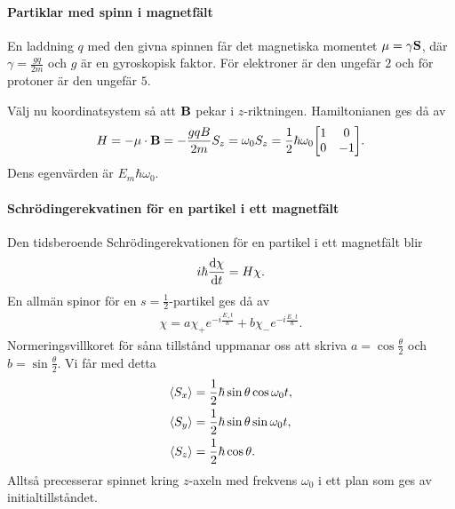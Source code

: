 \paragraph{Partiklar med spinn i magnetfält}
En laddning $q$ med den givna spinnen får det magnetiska momentet $\vb{\mu} = \gamma\vb{S}$, där $\gamma = \frac{gq}{2m}$ och $g$ är en gyroskopisk faktor. För elektroner är den ungefär $2$ och för protoner är den ungefär $5$.

Välj nu koordinatsystem så att $\vb{B}$ pekar i $z$-riktningen. Hamiltonianen ges då av
\begin{align*}
	H = -\vb{\mu}\cdot\vb{B} = -\frac{gqB}{2m}S_{z} = \omega_{0}S_{z} = \frac{1}{2}\hbar\omega_{0}
	\mqty[
		1 & 0 \\
		0 & -1
	].
\end{align*}
Dens egenvärden är $E_{m}\hbar\omega_{0}$.

\paragraph{Schrödingerekvatinen för en partikel i ett magnetfält}
Den tidsberoende Schrödingerekvationen för en partikel i ett magnetfält blir
\begin{align*}
	i\hbar\dv{\chi}{t} = H\chi.
\end{align*}
En allmän spinor för en $s = \frac{1}{2}$-partikel ges då av
\begin{align*}
	\chi = a\chi_{+}e^{-i\frac{E_{+}t}{\hbar}} + b\chi_{-}e^{-i\frac{E_{-}t}{\hbar}}.
\end{align*}
Normeringsvillkoret för såna tillstånd uppmanar oss att skriva $a = \cos{\frac{\theta}{2}}$ och $b = \sin{\frac{\theta}{2}}$. Vi får med detta
\begin{align*}
	\expval{S_{x}} &= \frac{1}{2}\hbar\sin{\theta}\cos{\omega_{0}t}, \\
	\expval{S_{y}} &= \frac{1}{2}\hbar\sin{\theta}\sin{\omega_{0}t}, \\
	\expval{S_{z}} &= \frac{1}{2}\hbar\cos{\theta}.
\end{align*}
Alltså precesserar spinnet kring $z$-axeln med frekvens $\omega_{0}$ i ett plan som ges av initialtillståndet.

